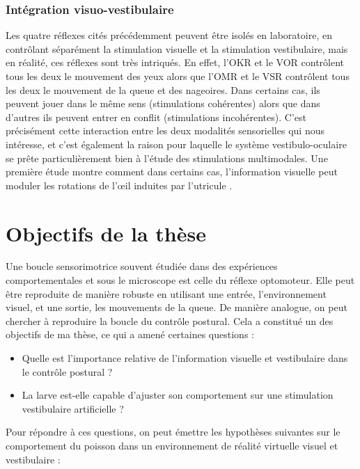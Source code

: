 \subsubsection{Intégration visuo-vestibulaire}

Les quatre réflexes cités précédemment peuvent être isolés en laboratoire, en contrôlant séparément la stimulation visuelle et la stimulation vestibulaire, mais en réalité, ces réflexes sont très intriqués. En effet, l'OKR et le VOR contrôlent tous les deux le mouvement des yeux alors que l'OMR et le VSR contrôlent tous les deux le mouvement de la queue et des nageoires. Dans certains cas, ils peuvent jouer dans le même sens (stimulations cohérentes) alors que dans d'autres ils peuvent entrer en conflit (stimulations incohérentes). C'est précisément cette interaction entre les deux modalités sensorielles qui nous intéresse, et c'est également la raison pour laquelle le système vestibulo-oculaire se prête particulièrement bien à l'étude des stimulations multimodales. Une première étude montre comment dans certains cas, l'information visuelle peut moduler les rotations de l'œil induites par l'utricule \cite{bianco_tangential_2012}.


\section{Objectifs de la thèse}


Une boucle sensorimotrice souvent étudiée dans des expériences comportementales et sous le microscope est celle du réflexe optomoteur. Elle peut être reproduite de manière robuste en utilisant une entrée, l'environnement visuel, et une sortie, les mouvements de la queue. De manière analogue, on peut chercher à reproduire la boucle du contrôle postural. Cela a constitué un des objectifs de ma thèse, ce qui a amené certaines questions : 

\begin{itemize}
  \item Quelle est l'importance relative de l'information visuelle et vestibulaire dans le contrôle postural ?
  \item La larve est-elle capable d'ajuster son comportement sur une stimulation vestibulaire artificielle ?
\end{itemize}

Pour répondre à ces questions, on peut émettre les hypothèses suivantes sur le comportement du poisson dans un environnement de réalité virtuelle visuel et vestibulaire :

